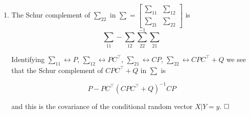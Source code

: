 \documentclass[letterpaper]{article}
\begin{document}
\begin{enumerate}
\begin{enumerate}
\item The Schur complement of $\sum_{22}$ in $\sum=\left[\begin{array}{cc}
\sum_{11} & \sum_{12} \\
\sum_{21} & \sum_{22} \end{array}\right]$ is
$$\textstyle \sum_{11} - \sum_{12} \sum_{22}^{-1} \sum_{21}$$

Identifying $\sum_{11} \leftrightarrow P$, $\sum_{12} \leftrightarrow PC^\top$, $\sum_{21} \leftrightarrow CP$, $\sum_{22} \leftrightarrow CPC^\top+Q$ we see that the Schur complement of $CPC^\top+Q$ in $\sum$ is

$$P-PC^\top(CPC^\top+Q)^{-1}CP$$

and this is the covariance of the conditional random vector $X|Y=y$. $\hfill \square$
\end{enumerate}
\end{enumerate}
\end{document}
